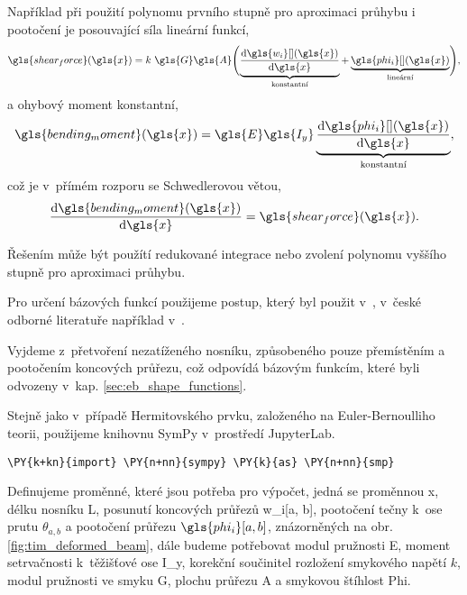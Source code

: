 Například při použití polynomu prvního stupně pro aproximaci průhybu i pootočení je posouvající síla lineární funkcí,
\begin{equation*}
    \gls{shear_force}(\gls{x}) = k~\gls{G} \gls{A}  \Biggl(
        \underbrace{\dv{\gls{w_i}[ ](\gls{x})}{\gls{x}}}_{\text{konstantní}} 
        + \underbrace{\gls{phi_i}[ ](\gls{x})}_{\text{lineární}} \Biggr),
\end{equation*}
a ohybový moment konstantní,
\begin{equation*}
    \gls{bending_moment}(\gls{x}) = \gls{E} \gls{I_y} \underbrace{\dv{\gls{phi_i}[ ](\gls{x})}{\gls{x}}}_{\text{konstantní}},
\end{equation*}
což je v~přímém rozporu se Schwedlerovou větou,
\begin{equation*}
    \dv{\gls{bending_moment}(\gls{x})}{\gls{x}} = \gls{shear_force}(\gls{x}).
\end{equation*}

Řešením může být použítí redukované integrace nebo zvolení polynomu vyššího stupně pro aproximaci průhybu.

Pro určení bázových funkcí použijeme postup, který byl použit v~\cite[kap. 5.6]{przemieniecki1985theory}, v~české odborné literatuře například v~\cite[kap. 2.2.2]{nmm1}.

Vyjdeme z~přetvoření nezatíženého nosníku, způsobeného pouze přemístěním a pootočením koncových průřezu, což odpovídá bázovým funkcím, které byli odvozeny v~kap. \ref{sec:eb_shape_functions}.

Stejně jako v~případě Hermitovského prvku, založeného na Euler-Bernoulliho teorii, použijeme knihovnu SymPy v~prostředí JupyterLab.

\begin{tcolorbox}[breakable, size=fbox, boxrule=1pt, pad at break*=1mm,colback=cellbackground, colframe=cellborder]
    \begin{Verbatim}[commandchars=\\\{\}]
    \PY{k+kn}{import} \PY{n+nn}{sympy} \PY{k}{as} \PY{n+nn}{smp}
    \end{Verbatim}
\end{tcolorbox}

Definujeme proměnné, které jsou potřeba pro výpočet, jedná se proměnnou \gls{x}, délku nosníku \gls{L}, posunutí koncových průřezů \gls{w_i}[a, b], 
pootočení tečny k~ose prutu $\theta_{a,b}$ a pootočení průřezu $\gls{phi_i}[a,b]$, znázorněných na obr. \ref{fig:tim_deformed_beam}, dále budeme potřebovat modul pružnosti \gls{E}, moment setrvačnosti k~těžišťové ose \gls{I_y}, korekční součinitel rozložení smykového napětí $k$, modul pružnosti ve smyku \gls{G}, plochu průřezu \gls{A} a smykovou štíhlost \gls{Phi}.

